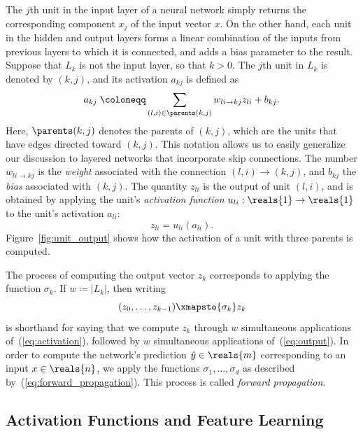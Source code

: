 \documentclass[11pt,a4paper]{article}
\numberwithin{equation}{section}
\newcommand{\weight}[2]{w_{#1 \rightarrow #2}}
\begin{document}
The $j$th unit in the input layer of a neural network simply returns the
corresponding component $x_j$ of the input vector $x$. On the other hand, each
unit in the hidden and output layers forms a linear combination of the inputs
from previous layers to which it is connected, and adds a bias parameter to the
result. Suppose that $L_k$ is not the input layer, so that $k > 0$. The $j$th
unit in $L_k$ is denoted by $(k, j)$, and its activation $a_{kj}$ is defined as
\begin{equation}
	a_{kj} \;\coloneqq \sum_{(l, i) \in \parents(k, j)} \weight{li}{kj} z_{li} + b_{kj}.
	\label{eq:activation}
\end{equation}
Here, $\parents(k, j)$ denotes the parents of $(k, j)$, which are the units that
have edges directed toward $(k, j)$. This notation allows us to easily
generalize our discussion to layered networks that incorporate skip connections.
The number $\weight{li}{kj}$ is the \emph{weight} associated with the connection
$(l, i) \rightarrow (k, j)$, and $b_{kj}$ the \emph{bias} associated with $(k,
j)$. The quantity $z_{li}$ is the output of unit $(l, i)$, and is obtained by
applying the unit's \emph{activation function} $u_{li} : \reals{1} \to
\reals{1}$ to the unit's activation $a_{li}$:
\begin{equation}
	z_{li} = u_{li}(a_{li}).
	\label{eq:output}
\end{equation}
Figure~\ref{fig:unit_output} shows how the activation of a unit with three
parents is computed.

The process of computing the output vector $z_k$ corresponds to applying the
function $\sigma_k$. If $w \coloneqq |L_k|$, then writing
\[
	(z_0, \ldots, z_{k - 1}) \xmapsto{\sigma_k} z_k
\]
is shorthand for saying that we compute $z_k$ through $w$ simultaneous
applications of~(\ref{eq:activation}), followed by $w$ simultaneous
applications of~(\ref{eq:output}). In order to compute the network's
prediction $\hat{y} \in \reals{m}$ corresponding to an input $x \in \reals{n}$,
we apply the functions $\sigma_1, \ldots, \sigma_d$ as described
by~(\ref{eq:forward_propagation}). This process is called \emph{forward
propagation}.

\subsection{Activation Functions and Feature Learning}
\end{document}
